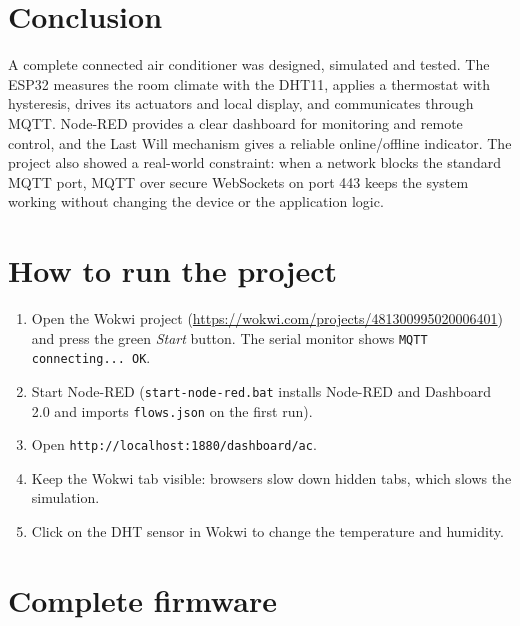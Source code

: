 \documentclass[11pt,a4paper]{article}
\begin{document}
\section{Conclusion}
A complete connected air conditioner was designed, simulated and tested. The ESP32 measures the
room climate with the DHT11, applies a thermostat with hysteresis, drives its actuators and
local display, and communicates through MQTT. Node-RED provides a clear dashboard for
monitoring and remote control, and the Last Will mechanism gives a reliable online/offline
indicator. The project also showed a real-world constraint: when a network blocks the standard
MQTT port, MQTT over secure WebSockets on port 443 keeps the system working without changing
the device or the application logic.

\appendix
\section{How to run the project}
\begin{enumerate}
  \item Open the Wokwi project (\url{https://wokwi.com/projects/481300995020006401}) and press
        the green \emph{Start} button. The serial monitor shows \texttt{MQTT connecting... OK}.
  \item Start Node-RED (\texttt{start-node-red.bat} installs Node-RED and Dashboard 2.0 and
        imports \texttt{flows.json} on the first run).
  \item Open \texttt{http://localhost:1880/dashboard/ac}.
  \item Keep the Wokwi tab visible: browsers slow down hidden tabs, which slows the simulation.
  \item Click on the DHT sensor in Wokwi to change the temperature and humidity.
\end{enumerate}

\section{Complete firmware}
\label{app:code}

\end{document}
